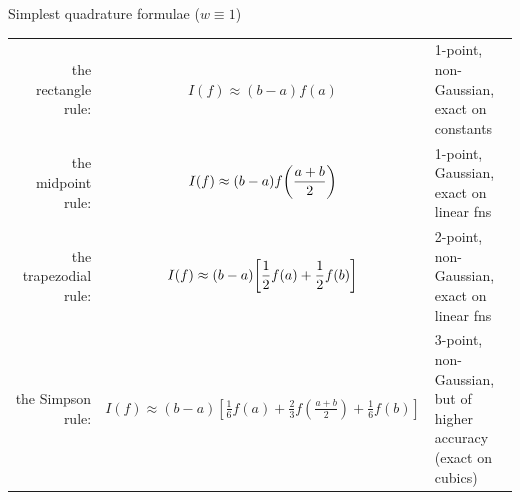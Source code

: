 \documentclass[a4paper]{article}
\begin{document}
\begin{example}
    Simplest quadrature formulae ($w\equiv 1$)
    \begin{center}
        \begin{tabular}{rcl}
            the rectangle rule: & $\displaystyle  I(f) \approx (b-a) f(a) $ & \parbox{3.5cm}{1-point, non-Gaussian,\\ exact on constants}\\[2em] 
            the midpoint rule: & $\displaystyle I(f)\approx (b-a)f\qty(\frac{a+b}{2}) $ & \parbox{3.5cm}{1-point, Gaussian,\\ exact on linear fns}\\[2em] 
            the trapezodial rule: & $\displaystyle I(f) \approx (b-a)\qty[\frac{1}{2}f(a)+\frac{1}{2}f(b)] $ & \parbox{3.5cm}{2-point, non-Gaussian,\\ exact on linear fns}\\[2em] 
            the Simpson rule: & $\displaystyle I(f) \approx(b-a)\left[\frac{1}{6} f(a)+\frac{2}{3} f\left(\frac{a+b}{2}\right)+\frac{1}{6} f(b)\right]$ & \parbox{3.5cm}{3-point, non-Gaussian,\\ but of higher accuracy \\ (exact on cubics)}
        \end{tabular}
    \end{center}
\end{example}
\end{document}
